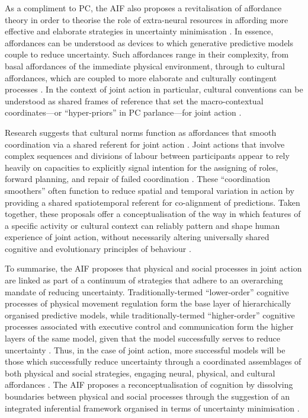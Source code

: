 \begin{CJK}{UTF8}{gbsn}
As a compliment to PC, the AIF also proposes a revitalisation of affordance theory \citep{Gibson1979} in order to theorise the role of extra-neural resources in affording more effective and elaborate strategies in uncertainty minimisation \citep{Friston2012}.  In essence, affordances can be understood as devices to which generative predictive models couple to reduce uncertainty.  Such affordances range in their complexity, from basal affordances of the immediate physical environment, through to cultural affordances, which are coupled to more elaborate and culturally contingent processes \citep{Ramstead2016}.  In the context of joint action in particular, cultural conventions can be understood as shared frames of reference that set the macro-contextual coordinates---or ``hyper-priors'' in PC parlance---for joint action \citep{Clark2013}.

Research suggests that cultural norms function as affordances that smooth coordination via a shared referent for joint action \citep{Vesper2017}. Joint actions that involve complex sequences and divisions of labour between participants appear to rely heavily on capacities to explicitly signal intention for the assigning of roles, forward planning, and repair of failed coordination \citep{Frith2010}.  These ``coordination smoothers'' \citep{Vesper2017} often function to reduce spatial and temporal variation in action by providing a shared spatiotemporal referent for co-alignment of predictions. Taken together, these proposals offer a conceptualisation of the way in which features of a specific activity or cultural context can reliably pattern and shape human experience of joint action, without necessarily altering universally shared cognitive and evolutionary principles of behaviour \citep{Roepstorff2010}.

To summarise, the AIF proposes that physical and social processes in joint action are linked as part of a continuum of strategies that adhere to an overarching mandate of reducing uncertainty.  Traditionally-termed ``lower-order'' cognitive processes of physical movement regulation form the base layer of hierarchically organised predictive models, while traditionally-termed ``higher-order'' cognitive processes associated with executive control and communication form the higher layers of the same model, given that the model successfully serves to reduce uncertainty \citep[over the lifespan of the organism][]{Ramstead2017}.  Thus, in the case of joint action, more successful models will be those which successfully reduce uncertainty through a coordinated assemblages of both physical and social strategies, engaging neural, physical, and cultural affordances \citep{Clark2015}.  The AIF proposes a reconceptualisation of cognition by dissolving boundaries between physical and social processes through the suggestion of an integrated inferential framework organised in terms of uncertainty minimisation \citep[cf.][]{Kahneman2011}.


\end{CJK}
